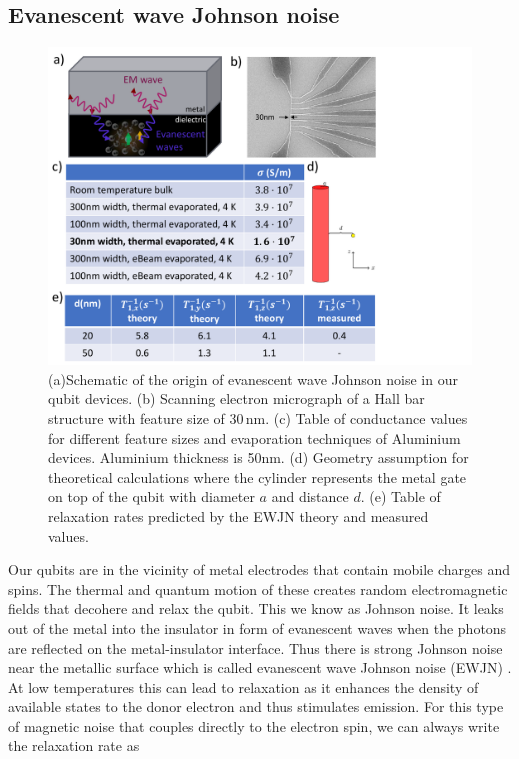 \documentclass[%
 reprint,
 amsmath,amssymb,
 aps,
]{revtex4-1}
\begin{document}
\subsection{\label{sec:ewjn}Evanescent wave Johnson noise}

\begin{figure}
\centering
\includegraphics[width=\columnwidth]{fig4.pdf}
\caption{
(a)Schematic of the origin of evanescent wave Johnson noise in our qubit devices. (b) Scanning electron micrograph of a Hall bar structure with feature size of $30\,$nm. (c) Table of conductance values for different feature sizes and evaporation techniques of Aluminium devices. 
Aluminium thickness is 50nm. (d) Geometry assumption for theoretical calculations where the cylinder represents the metal gate on top of the qubit with diameter $a$ and distance $d$. (e) Table of relaxation rates predicted by the EWJN theory and measured values. 
}
\label{fig:ewjn}
\end{figure}

Our qubits are in the vicinity of metal electrodes that contain mobile charges and spins. The thermal and quantum motion of these creates random electromagnetic fields that decohere and relax the qubit. This we know as Johnson noise. It leaks out of the metal into the insulator in form of evanescent waves when the photons are reflected on the metal-insulator interface. Thus there is strong Johnson noise near the metallic surface which is called evanescent wave Johnson noise (EWJN) \cite{Premakumar2017}. At low temperatures this can lead to relaxation as it enhances the density of available states to the donor electron and thus stimulates emission. For this type of magnetic noise that couples directly to the electron spin, we can always write the relaxation rate as
\end{document}
